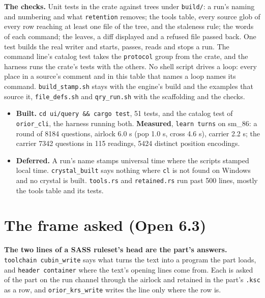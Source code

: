 \textbf{The checks.} Unit tests in the crate against trees under \texttt{build/\allowbreak{}}: a run's naming and numbering and what \texttt{retention} removes; the tools table, every source glob of every row reaching at least one file of the tree, and the staleness rule; the words of each command; the leaves, a diff displayed and a refused file passed back. One test builds the real writer and starts, passes, reads and stops a run. The command line's catalog test takes the \texttt{protocol} group from the crate, and the harness runs the crate's tests with the others. No shell script drives a loop: every place in a source's comment and in this table that names a loop names its command. \texttt{build\_\allowbreak{}stamp.\allowbreak{}sh} stays with the engine's build and the examples that source it, \texttt{file\_\allowbreak{}defs.\allowbreak{}sh} and \texttt{qry\_\allowbreak{}run.\allowbreak{}sh} with the scaffolding and the checks.

\begin{itemize}
\item \textbf{Built.} \texttt{cd ui/\allowbreak{}query \&\& cargo test}, 51 tests, and the catalog test of \texttt{orior\_\allowbreak{}cli}, the harness running both. \textbf{Measured}, \texttt{learn turns} on sm\_\allowbreak{}86: a round of 8184 questions, airlock 6.0 s (pop 1.0 s, cross 4.6 s), carrier 2.2 s; the carrier 7342 questions in 115 readings, 5424 distinct position encodings.
\item \textbf{Deferred.} A run's name stamps universal time where the scripts stamped local time. \texttt{crystal\_\allowbreak{}built} says nothing where \texttt{cl} is not found on Windows and no crystal is built. \texttt{tools.\allowbreak{}rs} and \texttt{retained.\allowbreak{}rs} run past 500 lines, mostly the tools table and its tests.
\end{itemize}

\section{\texorpdfstring{The frame asked (Open 6.3)}{The frame asked (Open 6.3)}}

\textbf{The two lines of a SASS ruleset's head are the part's answers.} \texttt{toolchain cubin\_\allowbreak{}write} says what turns the text into a program the part loads, and \texttt{header container} where the text's opening lines come from. Each is asked of the part on the run channel through the airlock and retained in the part's \texttt{.\allowbreak{}ksc} as a row, and \texttt{orior\_\allowbreak{}krs\_\allowbreak{}write} writes the line only where the row is.


